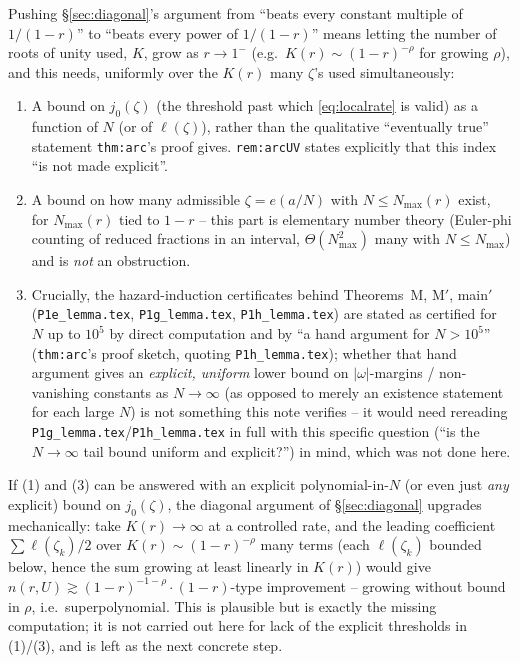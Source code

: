 \documentclass[11pt]{article}
\theoremstyle{remark}
\begin{document}
Pushing \S\ref{sec:diagonal}'s argument from ``beats every constant multiple of $1/(1-r)$'' to
``beats every power of $1/(1-r)$'' means letting the number of roots of unity used, $K$, grow as
$r\to1^-$ (e.g.\ $K(r)\sim(1-r)^{-\rho}$ for growing $\rho$), and this needs, uniformly over the
$K(r)$ many $\zeta$'s used simultaneously:
\begin{enumerate}
\item A bound on $j_0(\zeta)$ (the threshold past which \eqref{eq:localrate} is valid) as a function
of $N$ (or of $\ell(\zeta)$), rather than the qualitative ``eventually true'' statement
\texttt{thm:arc}'s proof gives. \texttt{rem:arcUV} states explicitly that this index ``is not made
explicit''.
\item A bound on how many admissible $\zeta=e(a/N)$ with $N\le N_{\max}(r)$ exist, for $N_{\max}(r)$
tied to $1-r$ -- this part is elementary number theory (Euler-phi counting of reduced fractions in an
interval, $\Theta(N_{\max}^2)$ many with $N\le N_{\max}$) and is \emph{not} an obstruction.
\item Crucially, the hazard-induction certificates behind Theorems~M, M$'$, main$'$
(\texttt{P1e\_lemma.tex}, \texttt{P1g\_lemma.tex}, \texttt{P1h\_lemma.tex}) are stated as certified
for $N$ up to $10^5$ by direct computation and by ``a hand argument for $N>10^5$'' (\texttt{thm:arc}'s
proof sketch, quoting \texttt{P1h\_lemma.tex}); whether that hand argument gives an \emph{explicit,
uniform} lower bound on $|\omega|$-margins / non-vanishing constants as $N\to\infty$ (as opposed to
merely an existence statement for each large $N$) is not something this note verifies -- it would
need rereading \texttt{P1g\_lemma.tex}/\texttt{P1h\_lemma.tex} in full with this specific question
(``is the $N\to\infty$ tail bound uniform and explicit?'') in mind, which was not done here.
\end{enumerate}
If (1) and (3) can be answered with an explicit polynomial-in-$N$ (or even just \emph{any} explicit)
bound on $j_0(\zeta)$, the diagonal argument of \S\ref{sec:diagonal} upgrades mechanically: take
$K(r)\to\infty$ at a controlled rate, and the leading coefficient $\sum\ell(\zeta_k)/2$ over
$K(r)\sim(1-r)^{-\rho}$ many terms (each $\ell(\zeta_k)$ bounded below, hence the sum growing at least
linearly in $K(r)$) would give $n(r,U)\gtrsim(1-r)^{-1-\rho}\cdot(1-r)$-type improvement -- growing
without bound in $\rho$, i.e.\ superpolynomial. This is plausible but is exactly the missing
computation; it is not carried out here for lack of the explicit thresholds in (1)/(3), and is left as
the next concrete step.
\end{document}
